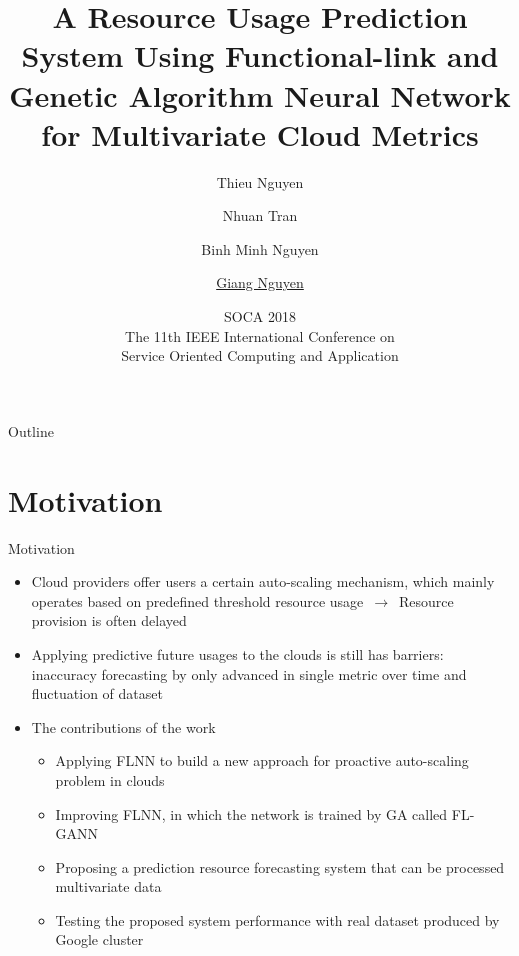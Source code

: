 \documentclass{beamer}
\title{\large A Resource Usage Prediction System Using Functional-link and Genetic Algorithm Neural Network for Multivariate Cloud Metrics}
\author{\small Thieu Nguyen \and Nhuan Tran \and Binh Minh Nguyen \\ \and \underline{Giang Nguyen}}
\institute{ Institute of Informatics\\ Slovak Academy of Sciences, Bratislava, Slovakia}
\date{SOCA 2018\\
	The 11th IEEE International Conference on\\ Service Oriented Computing and Application}
\begin{document}
\begin{frame}
  \titlepage
\end{frame}

\begin{frame}{Outline}
  \tableofcontents
\end{frame}


\section{Motivation}
\begin{frame}{Motivation}
	\begin{itemize}
		\item {Cloud providers offer users a certain auto-scaling mechanism, which mainly operates based on predefined threshold resource usage $\,\to\,$ Resource provision is often delayed}
		\item {Applying predictive future usages to the clouds is still has barriers: inaccuracy forecasting by only advanced in single metric over time and fluctuation of dataset}
		\item {The contributions of the work}
		\begin{itemize}
			\item Applying FLNN to build a new approach for proactive auto-scaling problem in clouds
			\item Improving FLNN, in which the network is trained by GA called FL-GANN
			\item Proposing a prediction resource forecasting system that can be processed multivariate data
			\item Testing the proposed system performance with real dataset produced by Google cluster
			
		\end{itemize}
		
	\end{itemize}
\end{frame}
\end{document}
